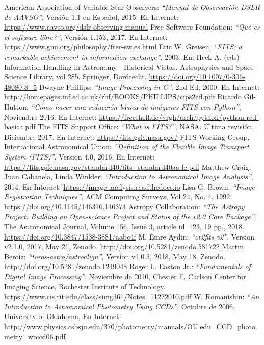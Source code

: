 \documentclass[a4paper, 12pt]{article}
\begin{document}
\begin{thebibliography}{100}
 American Association of Variable Star Observers: {\it ``Manual de Observación DSLR de AAVSO''}, Versión 1.1 en Español, 2015. En Internet: \url{https://www.aavso.org/dslr-observing-manual}
   Free Software Foundation: {\it ``Qué es el software libre?''}, Versión 1.153, 2017. En Internet: \url{https://www.gnu.org/philosophy/free-sw.es.html}
 Eric W. Greisen: {\it ``FITS: a remarkable achievement in information exchange''}, 2003. En: Heck A. (eds) Information Handling in Astronomy - Historical Vistas. Astrophysics and Space Science Library, vol 285. Springer, Dordrecht. \url{https://doi.org/10.1007/0-306-48080-8_5}
 Dwayne Phillips: {\it ``Image Processing in C''}, 2nd Ed, 2000. En Internet: \url{http://homepages.inf.ed.ac.uk/rbf/BOOKS/PHILLIPS/cips2ed.pdf}
 Ricardo Gil-Hutton: {\it ``Cómo hacer una reducción básica de imágenes FITS con Python''}, Noviembre 2016. En Internet: \url{https://freeshell.de/~rgh/arch/python/python-red-basica.pdf}
 The FITS Support Office: {\it ``What is FITS?''}, NASA. Última revisión, Diciembre 2017.  En Internet: \url{https://fits.gsfc.nasa.gov/}
 FITS Working Group, International Astronomical Union: {\it ``Definition of the Flexible Image Transport System (FITS)''}, Version 4.0, 2016. En Internet: \url{https://fits.gsfc.nasa.gov/standard40/fits_standard40aa-le.pdf}
 Matthew Craig, Juan Cabanela, Linda Winkler: {\it ``Introduction to Astronomical Image Analysis''}, 2014. En Internet: \url{https://image-analysis.readthedocs.io}
 Lisa G. Brown: {\it ``Image Registration Techniques''}, ACM Computmg Surveys, Vol 24, No. 4, 1992. \url{https://doi.org/10.1145/146370.146374}
 Astropy Collaboration: {\it ``The Astropy Project: Building an Open-science Project and Status of the v2.0 Core Package''}, The Astronomical Journal, Volume 156, Issue 3, article id. 123, 19 pp., 2018. \url{https://doi.org/10.3847/1538-3881/aabc4f}
  M. Emre Aydin: {\it ``cr2fits v2''}, Version v2.1.0, 2017, May 21, Zenodo. \url{http://doi.org/10.5281/zenodo.581722}
 Martin Beroiz: {\it ``toros-astro/astroalign''}, Version v1.0.3, 2018, May 18. Zenodo. \url{http://doi.org/10.5281/zenodo.1249048}
 Roger L. Easton Jr.: {\it ``Fundamentals of Digital Image Processing''}, Noviembre de 2010, Chester F. Carlson Center for Imaging Science, Rochester Institute of Technology. \url{https://www.cis.rit.edu/class/simg361/Notes_11222010.pdf}
 W. Romanishin: {\it ``An Introduction to Astronomical Photometry Using CCDs''},  Octubre de 2006, University of Oklahoma, En Internet: \url{http://www.physics.csbsju.edu/370/photometry/manuals/OU.edu_CCD_photometry_wrccd06.pdf}
\end{thebibliography}
\end{document}
